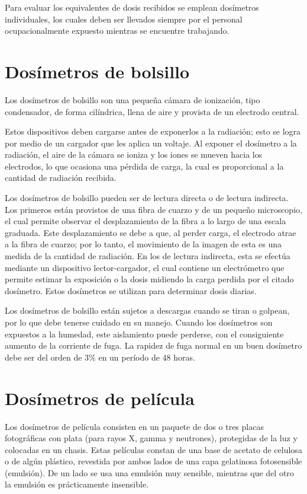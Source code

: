 Para evaluar los equivalentes de dosis recibidos se emplean dosímetros individuales, los cuales deben ser llevados siempre por el personal ocupacionalmente expuesto mientras se encuentre trabajando.

\section{Dosímetros de bolsillo}

Los dosímetros de bolsillo son una pequeña cámara de ionización, tipo condensador, de forma cilíndrica, llena de aire y provista de un electrodo central.

Estos dispositivos deben cargarse antes de exponerlos a la radiación; esto se logra por medio de un cargador que les aplica un voltaje. Al exponer el dosímetro a la radiación, el aire de la cámara se ioniza y los iones se mueven hacia los electrodos, lo que ocasiona una pérdida de carga, la cual es proporcional a la cantidad de radiación recibida.

Los dosímetros de bolsillo pueden ser de lectura directa o de lectura indirecta. Los primeros están provistos de una fibra de cuarzo y de un pequeño microscopio, el cual permite observar el desplazamiento de la fibra a lo largo de una escala graduada. Este desplazamiento se debe a que, al perder carga, el electrodo atrae a la fibra de cuarzo; por lo tanto, el movimiento de la imagen de esta es una medida de la cantidad de radiación. En los de lectura indirecta, esta se efectúa mediante un dispositivo lector-cargador, el cual contiene un electrómetro que permite estimar la exposición o la dosis midiendo la carga perdida por el citado dosímetro. Estos dosímetros se utilizan para determinar dosis diarias.

Los dosímetros de bolsillo están sujetos a descargas cuando se tiran o golpean, por lo que debe tenerse cuidado en su manejo. Cuando los dosímetros son expuestos a la humedad, este aislamiento puede perderse, con el consiguiente aumento de la corriente de fuga. La rapidez de fuga normal en un buen dosímetro debe ser del orden de 3\% en un período de 48 horas.

\section{Dosímetros de película}

Los dosímetros de película consisten en un paquete de dos o tres placas fotográficas con plata (para rayos X, gamma y neutrones), protegidas de la luz y colocadas en un chasis. Estas películas constan de una base de acetato de celulosa o de algún plástico, revestida por ambos lados de una capa gelatinosa fotosensible (emulsión). De un lado se usa una emulsión muy sensible, mientras que del otro la emulsión es prácticamente insensible.

